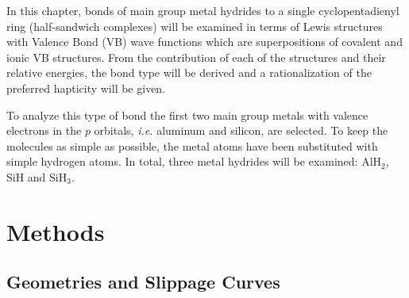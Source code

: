 In this chapter, bonds of main group metal hydrides to a single cyclopentadienyl ring (half-sandwich complexes) will be examined in terms of Lewis structures with Valence Bond (VB) wave functions which are superpositions of covalent and ionic VB structures. From the contribution of each of the structures and their relative energies, the bond type will be derived and a rationalization of the preferred hapticity will be given. 

To analyze this type of bond the first two main group metals with valence electrons in the $p$ orbitals, \textit{i.e.} aluminum and silicon, are selected. To keep the molecules as simple as possible, the metal atoms have been substituted with simple hydrogen atoms. In total, three metal hydrides will be examined: AlH$_2$, SiH and SiH$_3$. 

\section{Methods}

\subsection{\label{ch4.sec.geom}Geometries and Slippage Curves}

